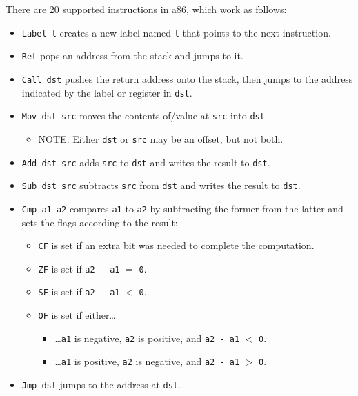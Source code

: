 \documentclass{article}
\newcommand{\lang}{a86}
\begin{document}
There are 20 supported instructions in \lang{}, which work as follows:

{\renewcommand\labelitemii{}\renewcommand\labelitemiii{}
  \begin{itemize}
  \item \texttt{Label l} creates a new label named \texttt{l} that points to the
    next instruction.
  \item \texttt{Ret} pops an address from the stack and jumps to it.
  \item \texttt{Call dst} pushes the return address onto the stack, then jumps
    to the address indicated by the label or register in \texttt{dst}.
  \item \texttt{Mov dst src} moves the contents of/value at \texttt{src} into
    \texttt{dst}.
    \begin{itemize}
    \item NOTE: Either \texttt{dst} or \texttt{src} may be an offset, but not
      both.
    \end{itemize}
  \item \texttt{Add dst src} adds \texttt{src} to \texttt{dst} and writes the
    result to \texttt{dst}.
  \item \texttt{Sub dst src} subtracts \texttt{src} from \texttt{dst} and writes
    the result to \texttt{dst}.
  \item \texttt{Cmp a1 a2} compares \texttt{a1} to \texttt{a2} by subtracting
    the former from the latter and sets the flags according to the result:
    \begin{itemize}
    \item \texttt{CF} is set if an extra bit was needed to complete the
      computation.
    \item \texttt{ZF} is set if \texttt{a2 - a1} $=$ \texttt{0}.
    \item \texttt{SF} is set if \texttt{a2 - a1} $<$ \texttt{0}.
    \item \texttt{OF} is set if either\ldots
      \begin{itemize}
      \item \ldots\texttt{a1} is negative, \texttt{a2} is positive, and
        \texttt{a2 - a1} $<$ \texttt{0}.
      \item \ldots\texttt{a1} is positive, \texttt{a2} is negative, and
        \texttt{a2 - a1} $>$ \texttt{0}.
      \end{itemize}
    \end{itemize}
  \item \texttt{Jmp dst} jumps to the address at \texttt{dst}.

\end{itemize}}
\end{document}
